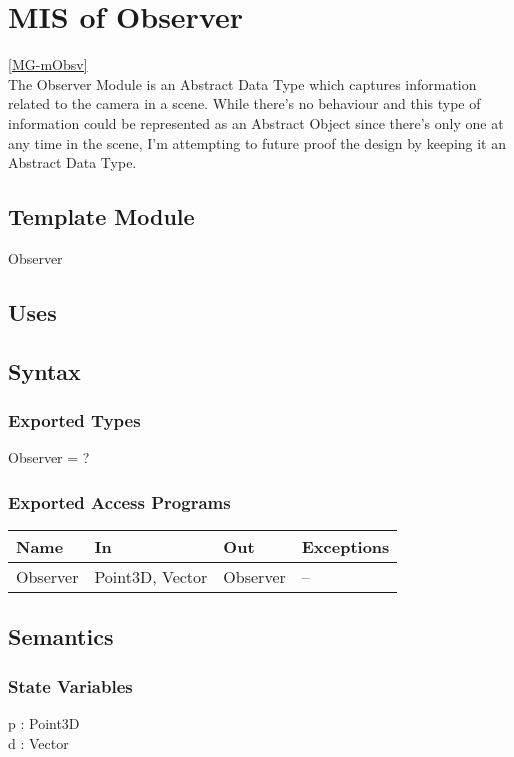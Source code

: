 \documentclass[12pt, titlepage]{article}
\begin{document}
\newpage

\section{MIS of Observer} \ref{MG-mObsv} \\
The Observer Module is an Abstract Data Type which captures information related 
to the camera in a scene. While there's no behaviour and this type of 
information could be represented as an Abstract Object since there's only one 
at any time in the scene, I'm attempting to future proof the design by keeping 
it an Abstract Data Type.

\subsection{Template Module}
Observer

\subsection{Uses}

\subsection{Syntax}
\subsubsection{Exported Types}
Observer = ?
\subsubsection{Exported Access Programs}
\begin{center}
	\begin{tabular}{p{3cm} p{4cm} p{2cm} p{4cm}}
		\hline
		\textbf{Name} & \textbf{In} & \textbf{Out} & \textbf{Exceptions} \\
		\hline
		Observer & Point3D, Vector & Observer & -- \\
		\hline
	\end{tabular}
\end{center}

\subsection{Semantics}
\subsubsection{State Variables}
p : Point3D\\
d : Vector\\
\end{document}
